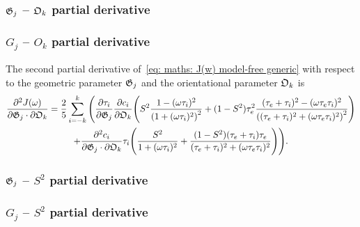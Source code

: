 \begin{latexonly}
    \subsubsection{$\mathfrak{G}_j$ -- $\mathfrak{O}_k$ partial derivative}
\end{latexonly}
\begin{htmlonly}
    \subsubsection{$G_j$ -- $O_k$ partial derivative}
\end{htmlonly}

The second partial derivative of~\eqref{eq: maths: J(w) model-free generic} with respect to the geometric parameter $\mathfrak{G}_j$ and the orientational parameter $\mathfrak{O}_k$ is
\begin{multline}
    \frac{\partial^2 J(\omega)}{\partial \mathfrak{G}_j \cdot \partial \mathfrak{O}_k} = \frac{2}{5} \sum_{i=-k}^k \Bigg(
        \frac{\partial \tau_i}{\partial \mathfrak{G}_j} \frac{\partial c_i}{\partial \mathfrak{O}_k} \Bigg(
            S^2 \frac{1 - (\omega \tau_i)^2}{\left(1 + (\omega \tau_i)^2 \right)^2}
            + (1 - S^2) \tau_e^2 \frac{(\tau_e + \tau_i)^2 - (\omega \tau_e \tau_i)^2}{\left((\tau_e + \tau_i)^2 + (\omega \tau_e \tau_i)^2 \right)^2}
        \Bigg) \\
        +  \frac{\partial^2 c_i}{\partial \mathfrak{G}_j \cdot \partial \mathfrak{O}_k} \tau_i \Bigg(
            \frac{S^2}{1 + (\omega \tau_i)^2}
            + \frac{(1 - S^2)(\tau_e + \tau_i)\tau_e}{(\tau_e + \tau_i)^2 + (\omega \tau_e \tau_i)^2}
        \Bigg)
    \Bigg).
\end{multline}



\begin{latexonly}
    \subsubsection{$\mathfrak{G}_j$ -- $S^2$ partial derivative}
\end{latexonly}
\begin{htmlonly}
    \subsubsection{$G_j$ -- $S^2$ partial derivative}
\end{htmlonly}

